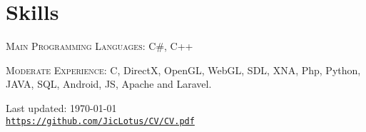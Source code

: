 \documentclass[letterpaper]{article}
\def\footerlink{https://github.com/JicLotus/CV/CV.pdf}
\newenvironment{no-indent-itemize}{
  \begin{list}{}{
    \setlength{\leftmargin}{0em}
  }
}{
  \end{list}
}
\begin{document}
\section*{Skills}
\begin{no-indent-itemize}
    
    \item\textsc{Main Programming Languages}: C\#, C++
    \item \textsc{Moderate Experience}: C, DirectX, OpenGL, WebGL, SDL, XNA, Php, Python, JAVA, SQL, Android, JS, Apache and Laravel.
    
\end{no-indent-itemize}


\bigskip
\begin{center}
  \begin{footnotesize}
    Last updated: \today \\
    \href{\footerlink}{\texttt{\footerlink}}
  \end{footnotesize}
\end{center}
\end{document}

